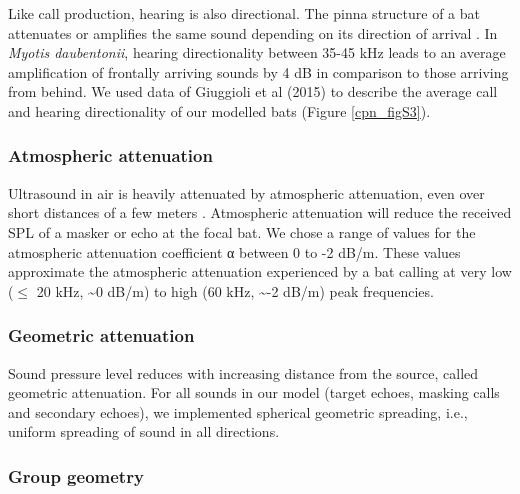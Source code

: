 \documentclass[
]{book}
\begin{document}
Like call production, hearing is also directional. The pinna structure of a bat
attenuates or amplifies the same sound depending on its direction of arrival \citep[\citet{f2008a}]{firzlaff2003a}. In \emph{Myotis daubentonii}, hearing directionality between 35-45 kHz leads to an average amplification of frontally arriving sounds by 4 dB in comparison to those arriving from behind. We used data of Giuggioli et al (2015) to describe the average call and hearing directionality of our modelled bats (Figure \ref{cpn_figS3}).

\hypertarget{atmospheric-attenuation}{%
\subsubsection{\texorpdfstring{Atmospheric attenuation \label{cpn_atmabs}}{Atmospheric attenuation }}\label{atmospheric-attenuation}}

Ultrasound in air is heavily attenuated by atmospheric attenuation, even over short distances of a few meters \citep[\citet{lawrence1982a}]{h2018a}. Atmospheric attenuation will reduce the received SPL of a masker or echo at the focal bat. We chose a range of values for the atmospheric attenuation coefficient α between 0 to -2 dB/m. These values approximate the atmospheric attenuation experienced by a bat calling at very low (\(\leq\) 20 kHz, \textasciitilde0 dB/m) to high (60 kHz, \textasciitilde-2 dB/m) peak frequencies.

\hypertarget{geometric-attenuation}{%
\subsubsection{\texorpdfstring{Geometric attenuation \label{cpn_geomattn}}{Geometric attenuation }}\label{geometric-attenuation}}

Sound pressure level reduces with increasing distance from the source, called
geometric attenuation. For all sounds in our model (target echoes, masking calls
and secondary echoes), we implemented spherical geometric spreading, i.e.,
uniform spreading of sound in all directions\citep{speaks1996a}.

\hypertarget{group-geometry}{%
\subsubsection{\texorpdfstring{Group geometry \label{cpn_groupgeom}}{Group geometry }}\label{group-geometry}}
\end{document}
